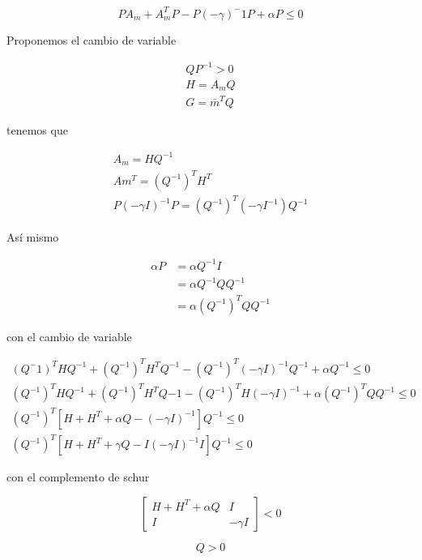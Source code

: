 \begin{equation*}
    PA_m+A_m^TP-P(-\gamma)^-1P+\alpha P \leq 0
\end{equation*}

Proponemos el cambio de variable

\begin{equation*}
    \begin{aligned}
        QP^{-1} >0 \\
        H = A_m Q \\
        G = \bar{m}^T Q
    \end{aligned}
\end{equation*}

tenemos que

\begin{equation*}
    \begin{aligned}
        A_m= HQ^{-1} \\
        Am^T=(Q^{-1})^TH^T\\
        P(-\gamma I)^{-1}P = (Q^{-1})^T(-\gamma I^{-1})Q^{-1}
    \end{aligned}
\end{equation*}

Así mismo

\begin{equation*}
    \begin{aligned}
        \alpha P &= \alpha Q^{-1}I \\
            &= \alpha Q^{-1}QQ^{-1}\\
            &= \alpha (Q^{-1})^TQQ^{-1}
    \end{aligned}
\end{equation*}

con el cambio de variable

\begin{equation*}
    \begin{aligned}
        (Q^-1)^THQ^{-1}+(Q^{-1})^TH^TQ^{-1} - (Q^{-1})^T(-\gamma I)^{-1}Q^{-1}+\alpha Q^{-1} \leq 0 \\
        (Q^{-1})^THQ^{-1}+(Q^{-1})^TH^TQ{-1}-(Q^{-1})^TH(-\gamma I)^{-1}+\alpha (Q^{-1})^TQQ^{-1} \leq 0 \\
        (Q^{-1})^T [H+H^T + \alpha Q - (- \gamma I )^{-1}]Q^{-1} \leq 0 \\
        (Q^{-1})^T [H + H^T + \gamma Q - I(- \gamma I)^{-1} I] Q^{-1} \leq 0
    \end{aligned}
\end{equation*}

con el complemento de schur

\begin{equation*}
    \begin{bmatrix}
        H+H^T+\alpha Q & I \\ I & -\gamma I
    \end{bmatrix} < 0
\end{equation*}

\begin{equation*}
    Q>0
\end{equation*}




